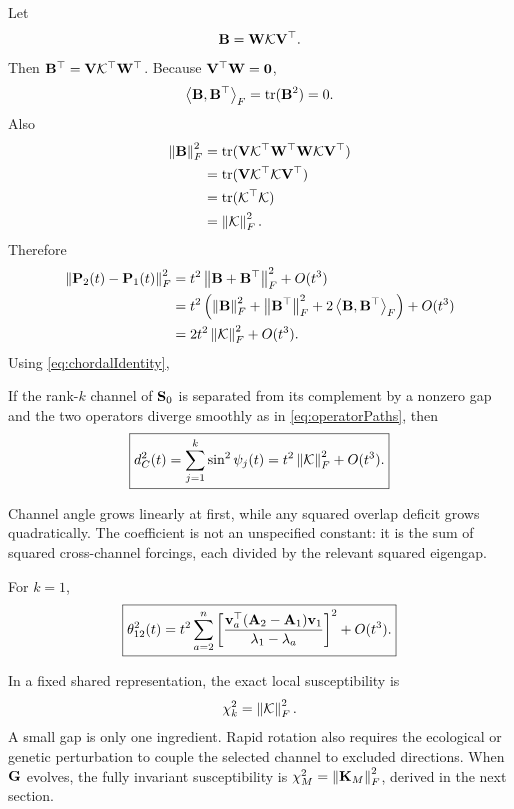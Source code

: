 Let
\begin{equation}
\mathbf B=\mathbf{W}\mathcal K\mathbf{V}^\top.
\end{equation}
Then \(\mathbf B^\top=\mathbf{V}\mathcal K^\top\mathbf{W}^\top\). Because \(\mathbf{V}^\top\mathbf{W}=\mathbf{0}\),
\begin{equation}
\left\langle \mathbf B,\mathbf B^\top\right\rangle_F
=\operatorname{tr}(\mathbf B^2)=0.
\end{equation}
Also
\begin{align}
\left\lVert \mathbf B\right\rVert_F^2
&=\operatorname{tr}(\mathbf{V}\mathcal K^\top\mathbf{W}^\top\mathbf{W}\mathcal K\mathbf{V}^\top)\\
&=\operatorname{tr}(\mathbf{V}\mathcal K^\top\mathcal K\mathbf{V}^\top)\\
&=\operatorname{tr}(\mathcal K^\top\mathcal K)\\
&=\left\lVert \mathcal K\right\rVert_F^2.
\end{align}
Therefore
\begin{align}
\left\lVert \mathbf{P}_2(t)-\mathbf{P}_1(t)\right\rVert_F^2
&=t^2\left\lVert \mathbf B+\mathbf B^\top\right\rVert_F^2+O(t^3)\\
&=t^2\left(\left\lVert \mathbf B\right\rVert_F^2+\left\lVert \mathbf B^\top\right\rVert_F^2
+2\left\langle \mathbf B,\mathbf B^\top\right\rangle_F\right)+O(t^3)\\
&=2t^2\left\lVert \mathcal K\right\rVert_F^2+O(t^3).
\end{align}
Using \cref{eq:chordalIdentity},
\begin{theorem}
If the rank-\(k\) channel of \(\mathbf{S}_0\) is separated from its complement by a nonzero gap and the two operators diverge smoothly as in \cref{eq:operatorPaths}, then
\begin{equation}
\boxed{
d_C^2(t)=\sum_{j=1}^k\sin^2\psi_j(t)
=t^2\left\lVert \mathcal K\right\rVert_F^2+O(t^3).}
\label{eq:localSnowballTheorem}
\end{equation}
\end{theorem}

\inwords Channel angle grows linearly at first, while any squared overlap deficit grows quadratically. The coefficient is not an unspecified constant: it is the sum of squared cross-channel forcings, each divided by the relevant squared eigengap.

For \(k=1\),
\begin{equation}
\boxed{
\theta_{12}^2(t)
=t^2\sum_{a=2}^n
\left[
\frac{\mathbf v_a^\top(\mathbf{A}_2-\mathbf{A}_1)\mathbf v_1}
{\lambda_1-\lambda_a}
\right]^2+O(t^3).}
\label{eq:rankOneSnowball}
\end{equation}

\begin{summarybox}
In a fixed shared representation, the exact local susceptibility is
\[
\chi_k^2=\left\lVert \mathcal K\right\rVert_F^2.
\]
A small gap is only one ingredient. Rapid rotation also requires the ecological or genetic perturbation to couple the selected channel to excluded directions. When \(\mathbf{G}\) evolves, the fully invariant susceptibility is \(\chi_M^2=\left\lVert \mathbf K_M\right\rVert_F^2\), derived in the next section.
\end{summarybox}

